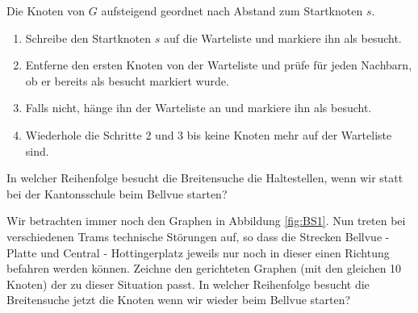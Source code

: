  Die Knoten von $G$ aufsteigend geordnet nach Abstand zum Startknoten $s$.

\begin{enumerate}
    \item Schreibe den Startknoten $s$ auf die Warteliste und markiere ihn als besucht.
    \item Entferne den ersten Knoten von der Warteliste und prüfe für jeden Nachbarn, ob er bereits als besucht markiert wurde.
    \item Falls nicht, hänge ihn der Warteliste an und markiere ihn als besucht.
    \item Wiederhole die Schritte 2 und 3 bis keine Knoten mehr auf der Warteliste sind.
\end{enumerate}

\begin{aufgabe} \label{newinitial}
In welcher Reihenfolge besucht die Breitensuche die Haltestellen, wenn wir statt bei der Kantonsschule beim Bellvue starten?
\end{aufgabe}

\begin{aufgabe} \label{directed}
Wir betrachten immer noch den Graphen in Abbildung \ref{fig:BS1}. Nun
treten bei verschiedenen Trams technische Störungen auf, so dass die Strecken Bellvue - Platte und Central - Hottingerplatz jeweils nur noch in dieser einen Richtung befahren werden können. Zeichne den gerichteten Graphen (mit den gleichen 10 Knoten) der zu dieser Situation passt. In welcher Reihenfolge besucht die Breitensuche jetzt die Knoten wenn wir wieder beim Bellvue starten? 
\end{aufgabe}


